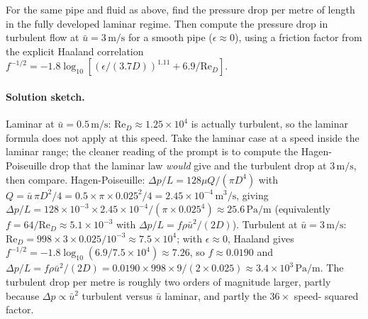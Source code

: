 \begin{exercise}
For the same pipe and fluid as above, find the pressure drop per
metre of length in the fully developed laminar regime. Then
compute the pressure drop in turbulent flow at $\bar{u} = 3\,\si{
\meter\per\second}$ for a smooth pipe ($\epsilon \approx 0$), using
a friction factor from the explicit Haaland correlation
$f^{-1/2} = -1.8\log_{10}[(\epsilon/(3.7D))^{1.11} + 6.9/\text{Re}_D]$.

\paragraph{Solution sketch.} Laminar at $\bar u = 0.5\,\si{\meter
\per\second}$: $\text{Re}_D \approx 1.25\times10^4$ is actually
turbulent, so the laminar formula does not apply at this speed. Take
the laminar case at a speed inside the laminar range; the cleaner
reading of the prompt is to compute the Hagen-Poiseuille drop that
the laminar law \emph{would} give and the turbulent drop at
$3\,\si{\meter\per\second}$, then compare. Hagen-Poiseuille:
$\Delta p/L = 128\mu Q/(\pi D^4)$ with $Q = \bar u\,\pi D^2/4 =
0.5\times\pi\times0.025^2/4 = 2.45\times10^{-4}\,\text{m}^3/\text{s}$,
giving $\Delta p/L = 128\times10^{-3}\times2.45\times10^{-4}/(\pi
\times0.025^4) \approx 25.6\,\si{\pascal\per\meter}$ (equivalently
$f = 64/\text{Re}_D \approx 5.1\times10^{-3}$ with $\Delta p/L =
f\rho\bar u^2/(2D)$). Turbulent at $\bar u = 3\,\si{\meter\per
\second}$: $\text{Re}_D = 998\times3\times0.025/10^{-3} \approx
7.5\times10^{4}$; with $\epsilon\approx0$, Haaland gives
$f^{-1/2} = -1.8\log_{10}(6.9/7.5\times10^{4}) \approx 7.26$, so
$f \approx 0.0190$ and $\Delta p/L = f\rho\bar u^2/(2D) =
0.0190\times998\times9/(2\times0.025) \approx 3.4\times10^{3}\,\si{
\pascal\per\meter}$. The turbulent drop per metre is roughly two
orders of magnitude larger, partly because $\Delta p\propto\bar u^2$
turbulent versus $\bar u$ laminar, and partly the $36\times$ speed-
squared factor.
\end{exercise}

